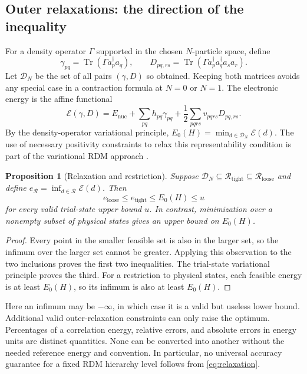 \documentclass[11pt,a4paper]{article}
\theoremstyle{plain}
\newtheorem{proposition}[theorem]{Proposition}
\theoremstyle{definition}
\theoremstyle{remark}
\DeclareMathOperator{\Tr}{Tr}
\begin{document}
\subsection{Outer relaxations: the direction of the inequality}
For a density operator $\Gamma$ supported in the chosen $N$-particle
space, define
\[
 \gamma_{pq}=\Tr(\Gamma a_p^\dagger a_q),\qquad
 D_{pq,rs}=\Tr(\Gamma a_p^\dagger a_q^\dagger a_s a_r).
\]
Let $\mathcal D_N$ be the set of all pairs $(\gamma,D)$ so obtained.
Keeping both matrices avoids any special case in a contraction formula at
$N=0$ or $N=1$. The electronic energy is the affine functional
\[
 \mathcal E(\gamma,D)=E_{\mathrm{nuc}}+
 \sum_{pq}h_{pq}\gamma_{pq}+\frac12\sum_{pqrs}v_{pqrs}D_{pq,rs}.
\]
By the density-operator variational principle,
$E_0(H)=\min_{d\in\mathcal D_N}\mathcal E(d)$.
The use of necessary positivity constraints to relax this representability
condition is part of the variational RDM approach \citep{Mazziotti2012}.

\begin{proposition}[Relaxation and restriction]
\label{prop:relaxation}
Suppose
$\mathcal D_N\subseteq\mathcal R_{\mathrm{tight}}
\subseteq\mathcal R_{\mathrm{loose}}$ and define
$e_{\mathcal R}=\inf_{d\in\mathcal R}\mathcal E(d)$.
Then
\begin{equation}
 e_{\mathrm{loose}}\le e_{\mathrm{tight}}\le E_0(H)\le u
 \label{eq:relaxation}
\end{equation}
for every valid trial-state upper bound $u$.
In contrast, minimization over a nonempty subset of physical states gives an
upper bound on $E_0(H)$.
\end{proposition}
\begin{proof}
Every point in the smaller feasible set is also in the larger set, so the
infimum over the larger set cannot be greater. Applying this observation to
the two inclusions proves the first two inequalities. The trial-state
variational principle proves the third. For a restriction to physical
states, each feasible energy is at least $E_0(H)$, so its infimum is also
at least $E_0(H)$.
\end{proof}

Here an infimum may be $-\infty$, in which case it is a valid but useless
lower bound. Additional valid outer-relaxation constraints can only raise
the optimum. Percentages of a correlation energy, relative errors, and
absolute errors in energy units are distinct quantities. None can be
converted into another without the needed reference energy and convention.
In particular, no universal accuracy guarantee for a fixed RDM hierarchy
level follows from \eqref{eq:relaxation}.
\end{document}
